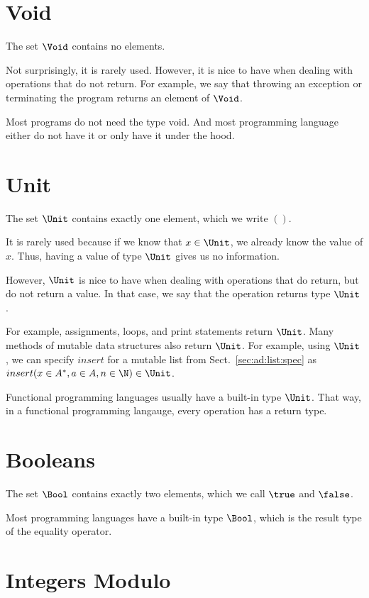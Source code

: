 \section{Void}

The set $\Void$ contains no elements.

Not surprisingly, it is rarely used.
However, it is nice to have when dealing with operations that do not return.
For example, we say that throwing an exception or terminating the program returns an element of $\Void$.

Most programs do not need the type void.
And most programming language either do not have it or only have it under the hood.

\section{Unit}

The set $\Unit$ contains exactly one element, which we write $()$.

It is rarely used because if we know that $x\in\Unit$, we already know the value of $x$.
Thus, having a value of type $\Unit$ gives us no information.

However, $\Unit$ is nice to have when dealing with operations that do return, but do not return a value.
In that case, we say that the operation returns type $\Unit$.

For example, assignments, loops, and print statements return $\Unit$.
Many methods of mutable data structures also return $\Unit$.
For example, using $\Unit$, we can specify $insert$ for a mutable list from Sect.~\ref{sec:ad:list:spec} as $insert(x\in A^*,a\in A,n\in\N)\in\Unit$.

Functional programming languages usually have a built-in type $\Unit$.
That way, in a functional programming langauge, every operation has a return type.

\section{Booleans}

The set $\Bool$ contains exactly two elements, which we call $\true$ and $\false$.

Most programming languages have a built-in type $\Bool$, which is the result type of the equality operator.

\section{Integers Modulo}


